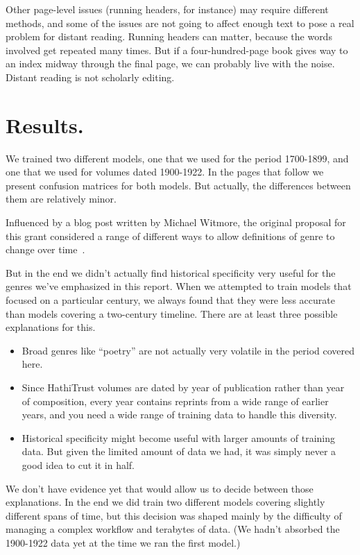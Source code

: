 \documentclass[paper=a4, fontsize=12pt]{scrartcl}
\numberwithin{equation}{section}		%
\numberwithin{figure}{section}			%
\numberwithin{table}{section}				%
\begin{document}
Other page-level issues (running headers, for instance) may require different methods, and some of the issues are not going to affect enough text to pose a real problem for distant reading. Running headers can matter, because the words involved get repeated many times. But if a four-hundred-page book gives way to an index midway through the final page, we can probably live with the noise. Distant reading is not scholarly editing.

\section{Results.}

We trained two different models, one that we used for the period 1700-1899, and one that we used for volumes dated 1900-1922. In the pages that follow we present confusion matrices for both models. But actually, the differences between them are relatively minor.

Influenced by a blog post written by Michael Witmore, the original proposal for this grant considered a range of different ways to allow definitions of genre to change  over time~\cite{witmore:time, underwood:mutable}.

But in the end we didn't actually find historical specificity very useful for the genres we've emphasized in this report. When we attempted to train models that focused on a particular century, we always found that they were less accurate than models covering a two-century timeline. There are at least three possible explanations for this.

\begin{itemize}
\item Broad genres like ``poetry'' are not actually very volatile in the period covered here.
\item Since HathiTrust volumes are dated by year of publication rather than year of composition, every year contains reprints from a wide range of earlier years, and you need a wide range of training data to handle this diversity.
\item Historical specificity might become useful with larger amounts of training data. But given the limited amount of data we had, it was simply never a good idea to cut it in half.
\end{itemize}

We don't have evidence yet that would allow us to decide between those explanations. In the end we did train two different models covering slightly different spans of time, but this decision was shaped mainly by the difficulty of managing a complex workflow and terabytes of data. (We hadn't absorbed the 1900-1922 data yet at the time we ran the first model.)
\end{document}
